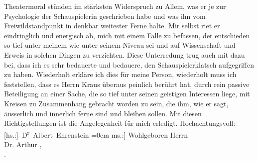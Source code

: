 \begin{ledgroupsized}[t]{13cm}
                    Theatermoral stünden im stärksten Widerspruch zu Allem, was er je zur
                    Psychologie der Schauspielerin geschrieben habe und was ihn vom
                    Freiwildstandpunkt in denkbar weitester Ferne halte. Mir selbst riet er
                    eindringlich und energisch ab, mich mit einem Falle zu befassen, der entschieden
                    so tief unter meinem wie unter seinem Niveau sei und auf Wissenschaft und Erweis
                    in solchen Dingen zu verzichten. Diese Unterredung trug auch mit dazu bei, dass
                    ich es sehr bedauerte und bedauere, den Schauspielerklatsch aufgegriffen zu
                    haben. Wiederholt erkläre ich dies für meine Person, wiederholt muss ich
                    feststellen, dass es Herrn Kraus überaus
                    peinlich berührt hat, durch rein passive Beteiligung an einer Sache, die so tief
                    unter seinen geistigen Interessen liege, mit Kreisen zu Zusammenhang gebracht
                    worden zu sein, die ihm, wie er sagt, äusserlich und innerlich ferne sind und
                    bleiben sollen.\pend
           \pstart
           Mit diesen Richtigstellungen ist die Angelegenheit für mich erledigt.\pend
           \pstart
           Hochachtungsvoll:{\\[\baselineskip]}\spacefill\mbox{{[}hs.:{]} D\textsuperscript{r} Albert Ehrenstein}\pend
           \leftskip=0em{}\pstart
           \noindent{}{[}ms.:{]} Wohlgeboren Herrn{\\}Dr. Arthur ,{\\}.\pend
                     \endnumbering{}\end{ledgroupsized}  \newcommand{\dateiname}{L02017}\newcommand{\titel}{Albert Ehrenstein an Arthur Schnitzler, 27. 4. 1911}\newcommand{\editorInnen}{Martin Anton Müller und Gerd-Hermann Susen}
      